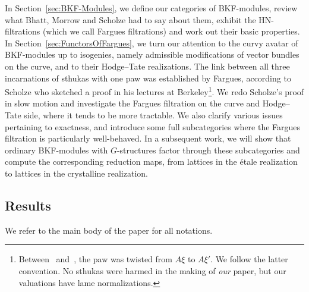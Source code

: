 \documentclass[11pt]{article}
\theoremstyle{definition}
\numberwithin{equation}{section}
\numberwithin{figure}{section}
\numberwithin{table}{section}
\begin{document}
In Section~\ref{sec:BKF-Modules}, we define our categories of BKF-modules, review what Bhatt, Morrow and Scholze had to say about them, exhibit the HN-filtrations (which we call Fargues filtrations) and work out their basic properties. In Section~\ref{sec:FunctorsOfFargues}, we turn our attention to the curvy avatar of BKF-modules up to isogenies, namely admissible modifications of vector bundles on the curve, and to their Hodge--Tate realizations. The link between all three incarnations of sthukas with one paw was established by Fargues, according to Scholze who sketched a proof in his lectures at Berkeley\footnote{Between~\cite{ScWe15} and~\cite{BaMoSc16}, the paw was twisted from $A\xi$ to $A\xi'$. We follow the latter convention. No sthukas were harmed in the making of \emph{our} paper, but our valuations have lame normalizations. }. We redo Scholze's proof in slow motion and investigate the Fargues filtration on the curve and Hodge--Tate side, where it tends to be more tractable. We also clarify various issues pertaining to exactness, and introduce some full subcategories where the Fargues filtration is particularly well-behaved. In a subsequent work, we will show that ordinary BKF-modules with $G$-structures factor through these subcategories and compute the corresponding reduction maps, from lattices in the \'etale realization to lattices in the crystalline realization.

\subsection{Results}

We refer to the main body of the paper for all notations.
\end{document}
